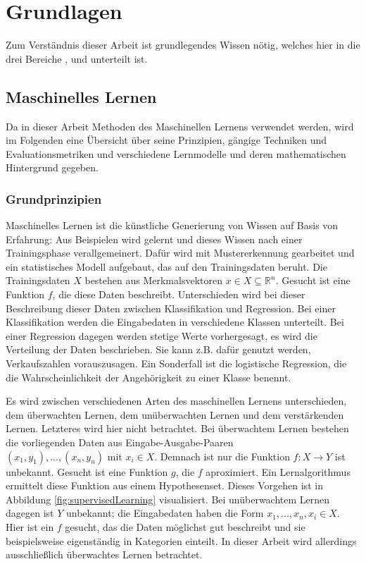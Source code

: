 \chapter{Grundlagen}\label{grundlagen}

Zum Verständnis dieser Arbeit ist grundlegendes Wissen nötig, welches hier in die drei Bereiche ,  und  unterteilt ist.


\section{Maschinelles Lernen}\label{ml-grundlagen}

Da in dieser Arbeit Methoden des Maschinellen Lernens verwendet werden, wird im Folgenden eine Übersicht über seine Prinzipien, gängige Techniken und Evaluationsmetriken und verschiedene Lernmodelle und deren mathematischen Hintergrund gegeben.

	\subsection{Grundprinzipien}
	
	Maschinelles Lernen ist die \glqq künstliche\grqq{} Generierung von Wissen auf Basis von Erfahrung: Aus Beispielen wird gelernt und dieses Wissen nach einer Trainingsphase verallgemeinert. Dafür wird mit Mustererkennung gearbeitet und ein statistisches Modell aufgebaut, das auf den Trainingsdaten beruht. Die Trainingsdaten $X$ bestehen aus Merkmalsvektoren  $x \in X \subseteq \mathbb{R}^n$. Gesucht ist eine Funktion $f$, die diese Daten beschreibt. Unterschieden wird bei dieser Beschreibung dieser Daten zwischen Klassifikation und Regression. Bei einer Klassifikation werden die Eingabedaten in verschiedene Klassen unterteilt. Bei einer Regression dagegen werden stetige Werte vorhergesagt, es wird die Verteilung der Daten beschrieben. Sie kann z.B. dafür genutzt werden, Verkaufszahlen vorauszusagen. Ein Sonderfall ist die logistische Regression, die die Wahrscheinlichkeit der Angehörigkeit zu einer Klasse benennt.
	
	Es wird zwischen verschiedenen Arten des maschinellen Lernens unterschieden, dem überwachten Lernen, dem unüberwachten Lernen und dem verstärkenden Lernen. Letzteres wird hier nicht betrachtet. Bei überwachtem Lernen bestehen die vorliegenden Daten aus Eingabe-Ausgabe-Paaren $(x_1, y_1), ...,(x_n, y_n) \text{ mit } x_i \in X$.%
	 Demnach ist nur die Funktion $f: X \to Y$ ist unbekannt. Gesucht ist eine Funktion $g$, die $f$ aproximiert. Ein Lernalgorithmus ermittelt diese Funktion aus einem Hypothesenset. Dieses Vorgehen ist in Abbildung \ref{fig:supervisedLearning} visualisiert. Bei unüberwachtem Lernen dagegen ist $Y$ unbekannt; die Eingabedaten haben die Form $x_1, ..., x_n, x_i \in X$. Hier ist ein $f$ gesucht, das die Daten möglichst gut beschreibt und sie beispielsweise eigenständig in Kategorien einteilt. In dieser Arbeit wird allerdings ausschließlich überwachtes Lernen betrachtet.
	
